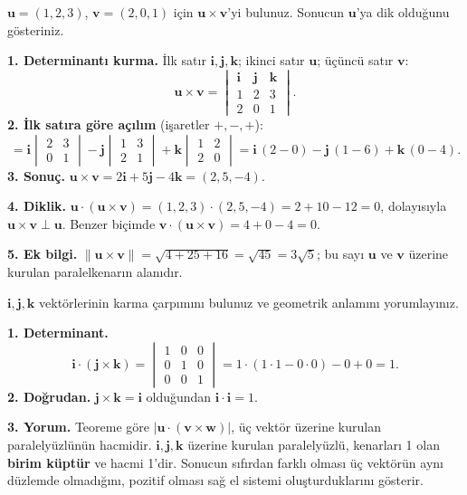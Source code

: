 \begin{soru}
$\mathbf u=(1,2,3)$, $\mathbf v=(2,0,1)$ için $\mathbf u\times\mathbf v$'yi bulunuz. Sonucun $\mathbf u$'ya dik olduğunu gösteriniz.
\end{soru}
\begin{cevap}
\textbf{1. Determinantı kurma.} İlk satır $\mathbf i,\mathbf j,\mathbf k$; ikinci satır $\mathbf u$; üçüncü satır $\mathbf v$:
\[
\mathbf u\times\mathbf v=\begin{vmatrix}\mathbf i&\mathbf j&\mathbf k\\1&2&3\\2&0&1\end{vmatrix}.
\]
\textbf{2. İlk satıra göre açılım} (işaretler $+,-,+$):
\[
=\mathbf i\begin{vmatrix}2&3\\0&1\end{vmatrix}-\mathbf j\begin{vmatrix}1&3\\2&1\end{vmatrix}+\mathbf k\begin{vmatrix}1&2\\2&0\end{vmatrix}
=\mathbf i\,(2-0)-\mathbf j\,(1-6)+\mathbf k\,(0-4).
\]
\textbf{3. Sonuç.} $\mathbf u\times\mathbf v=2\mathbf i+5\mathbf j-4\mathbf k=(2,5,-4)$.

\textbf{4. Diklik.} $\mathbf u\cdot(\mathbf u\times\mathbf v)=(1,2,3)\cdot(2,5,-4)=2+10-12=0$, dolayısıyla $\mathbf u\times\mathbf v\perp\mathbf u$. Benzer biçimde $\mathbf v\cdot(\mathbf u\times\mathbf v)=4+0-4=0$.

\textbf{5. Ek bilgi.} $\|\mathbf u\times\mathbf v\|=\sqrt{4+25+16}=\sqrt{45}=3\sqrt5$; bu sayı $\mathbf u$ ve $\mathbf v$ üzerine kurulan paralelkenarın alanıdır.
\end{cevap}

\begin{soru}
$\mathbf i,\mathbf j,\mathbf k$ vektörlerinin karma çarpımını bulunuz ve geometrik anlamını yorumlayınız.
\end{soru}
\begin{cevap}
\textbf{1. Determinant.}
\[
\mathbf i\cdot(\mathbf j\times\mathbf k)=\begin{vmatrix}1&0&0\\0&1&0\\0&0&1\end{vmatrix}=1\cdot(1\cdot1-0\cdot0)-0+0=1 .
\]
\textbf{2. Doğrudan.} $\mathbf j\times\mathbf k=\mathbf i$ olduğundan $\mathbf i\cdot\mathbf i=1$.

\textbf{3. Yorum.} Teoreme göre $|\mathbf u\cdot(\mathbf v\times\mathbf w)|$, üç vektör üzerine kurulan paralelyüzlünün hacmidir. $\mathbf i,\mathbf j,\mathbf k$ üzerine kurulan paralelyüzlü, kenarları 1 olan \textbf{birim küptür} ve hacmi 1'dir. Sonucun sıfırdan farklı olması üç vektörün aynı düzlemde olmadığını, pozitif olması sağ el sistemi oluşturduklarını gösterir.
\end{cevap}

